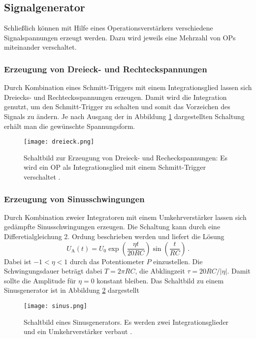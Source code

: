 \documentclass[
  bibliography=totoc,     %
  captions=tableheading,  %
  titlepage=firstiscover, %
]{scrartcl}
\begin{document}
\subsection{Signalgenerator}
\label{subsec:signalgenerator}
Schließlich können mit Hilfe eines Operationsverstärkers verschiedene
Signalspannungen erzeugt werden. Dazu wird jeweils eine Mehrzahl von OPs
miteinander verschaltet.

\subsubsection{Erzeugung von Dreieck- und Rechteckspannungen}
\label{subsubsec:dreieck}
Durch Kombination eines Schmitt-Triggers mit einem Integrationsglied
lassen sich Dreiecks- und Rechtecksspannungen erzeugen. Damit wird die
Integration genutzt, um den Schmitt-Trigger zu schalten und somit das
Vorzeichen des Signals zu ändern. Je nach Ausgang der in Abbildung
\ref{fig:dreieck} dargestellten Schaltung erhält man die gewünschte
Spannungsform.
\begin{figure}
    \centering
    \texttt{[image: dreieck.png]}
    \caption{
        Schaltbild zur Erzeugung von Dreieck- und Recheckspannungen:
        Es wird ein OP als Integrationsglied mit einem Schmitt-Trigger
        verschaltet \cite{V51}.
    }
    \label{fig:dreieck}
\end{figure}

\subsubsection{Erzeugung von Sinusschwingungen}
\label{subsubsec:sinusschwingungen}
Durch Kombination zweier Integratoren mit einem Umkehrverstärker lassen sich
gedämpfte Sinusschwingungen erzeugen.
Die Schaltung kann durch eine Differetialgleichung 2. Ordung beschrieben
werden und liefert die Lösung
\begin{equation*}
    U_\text{A}(t) = U_0 \exp\!\left( \frac{\eta t}{\num{20} RC} \right)
                        \sin\!\left( \frac{t}{RC} \right)\,.
\end{equation*}
Dabei ist $\num{-1} < \eta < \num{1}$ durch das Potentiometer $P$ einzustellen.
Die Schwingungsdauer beträgt dabei $T = 2\pi RC$, die Abklingzeit
$\tau = 20 RC / |\eta|$. Damit sollte die Amplitude für $\eta = \num{0}$
konstant bleiben.
Das Schaltbild zu einem Sinusgenerator ist in Abbildung \ref{fig:sinus}
dargestellt
\begin{figure}
    \centering
    \texttt{[image: sinus.png]}
    \caption{
        Schaltbild eines Sinusgenerators. Es werden zwei Integrationsglieder
        und ein Umkehrverstärker verbaut \cite{V51}.
    }
    \label{fig:sinus}
\end{figure}
\end{document}
